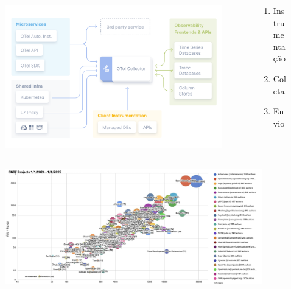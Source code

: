 \documentclass[aspectratio=169]{beamer}
\begin{document}
	
	\begin{frame}
		
		\begin{columns}
			\begin{column}{0.75\textwidth}
				\begin{figure}
					\centering
					\includegraphics[width=\linewidth]{Images/otelcollector}
					\label{fig:otelcollector}
				\end{figure}
			\end{column}
			\begin{column}{0.25\textwidth}  %
				\begin{enumerate}
					\item Instrumentação
					\item Coleta
					\item Envio
				\end{enumerate}
			\end{column}
		\end{columns}
		
		
	\end{frame}
	
	\begin{frame}
		\begin{figure}
			\centering
			\includegraphics[width=\linewidth]{Images/landscape}
			\label{fig:cncfprojects}
		\end{figure}
	\end{frame}
		
\end{document}
